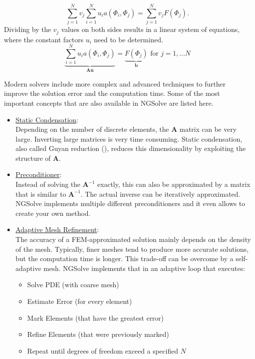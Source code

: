 \documentclass[./\jobname.tex]{subfiles}
\begin{document}
\begin{enumerate}
		  \begin{equation}
		  \sum_{j=1}^{N} v_j \sum_{i=1}^{N} u_i a(\Phi_i, \Phi_j) = \sum_{j=1}^{N} v_j F(\Phi_j).
		  \end{equation} 
		  Dividing by the $v_j$ values on both sides results in a linear system of equations, where the constant factors $u_i$ need to be determined.  
		  \begin{equation}
		  \label{eq:linear_system_of_equations}
		  \underbrace{\sum_{i=1}^{N} u_i a(\Phi_i, \Phi_j)}_{\mathbf{A u}} = \underbrace{F(\Phi_j)}_{\mathbf{b}} \text{ for $j=1,...N$}
		  \end{equation}
\end{enumerate}

Modern solvers include more complex and advanced techniques to further improve the solution error and the computation time. Some of the most important concepts that are also available in NGSolve are listed here. 

\begin{itemize}
	\item \underline{Static Condensation}: \\
		  Depending on the number of discrete elements, the $\mathbf{A}$ matrix can be very large. Inverting large matrices is very time consuming. Static condensation, also called Guyan reduction (\cite{guyan_reduction_1965}), reduces this dimensionality by exploiting the structure of $\mathbf{A}$. 
	\item \underline{Preconditioner}: \\
		  Instead of solving the $\mathbf{A}^{-1}$ exactly, this can also be approximated by a matrix that is similar to $\mathbf{A}^{-1}$. The actual inverse can be iteratively approximated. NGSolve implements multiple different preconditioners and it even allows to create your own method. 
	\item \underline{Adaptive Mesh Refinement}: \\
		The accuracy of a FEM-approximated solution mainly depends on the density of the mesh. Typically, finer meshes tend to produce more accurate solutions, but the computation time is longer. This trade-off can be overcome by a self-adaptive mesh. NGSolve implements that in an adaptive loop that executes: 
		\begin{itemize}
			\item Solve PDE (with coarse mesh)
			\item Estimate Error (for every element)
			\item Mark Elements (that have the greatest error)
			\item Refine Elements (that were previously marked)
			\item Repeat until degrees of freedom exceed a specified $N$
		\end{itemize}
\end{itemize}
\end{document}
